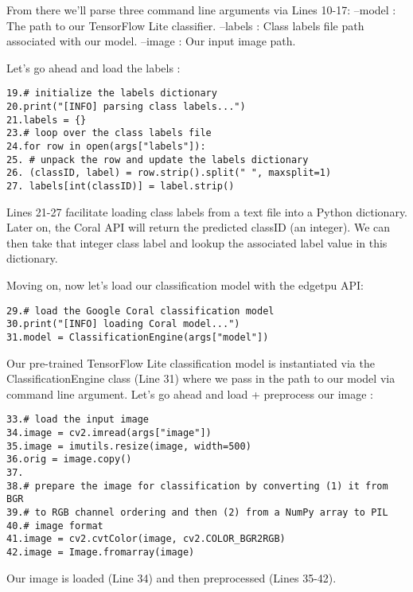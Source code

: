 From there we’ll parse three command line arguments via Lines 10-17:\newline
--model : The path to our TensorFlow Lite classifier.\newline
--labels : Class labels file path associated with our model.\newline
--image : Our input image path.\newline

Let’s go ahead and load the labels :\newline
\begin{verbatim}
19.# initialize the labels dictionary
20.print("[INFO] parsing class labels...")
21.labels = {}
23.# loop over the class labels file
24.for row in open(args["labels"]):
25.	# unpack the row and update the labels dictionary
26.	(classID, label) = row.strip().split(" ", maxsplit=1)
27.	labels[int(classID)] = label.strip()

\end{verbatim}

Lines 21-27 facilitate loading class labels  from a text file into a Python dictionary. Later on, the Coral API will return the predicted classID  (an integer). We can then take that integer class label and lookup the associated  label  value in this dictionary.\newline

Moving on, now let’s load our classification model  with the edgetpu  API:\newline
\begin{verbatim}
29.# load the Google Coral classification model
30.print("[INFO] loading Coral model...")
31.model = ClassificationEngine(args["model"])
\end{verbatim}

Our pre-trained TensorFlow Lite classification model  is instantiated via the ClassificationEngine  class (Line 31) where we pass in the path to our model via command line argument.\newline
Let’s go ahead and load + preprocess our image :\newline
\begin{verbatim}
33.# load the input image
34.image = cv2.imread(args["image"])
35.image = imutils.resize(image, width=500)
36.orig = image.copy()
37.
38.# prepare the image for classification by converting (1) it from BGR
39.# to RGB channel ordering and then (2) from a NumPy array to PIL
40.# image format
41.image = cv2.cvtColor(image, cv2.COLOR_BGR2RGB)
42.image = Image.fromarray(image)

\end{verbatim}
Our image  is loaded (Line 34) and then preprocessed (Lines 35-42).\newline


